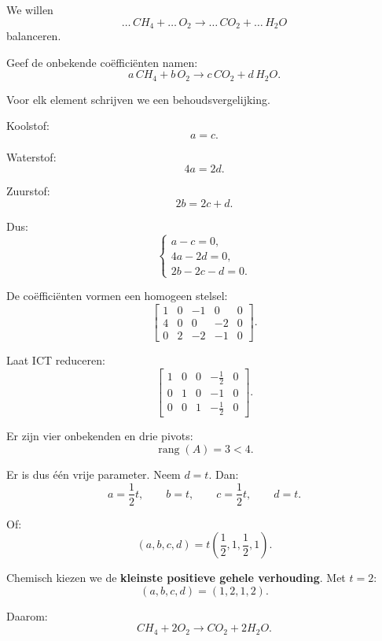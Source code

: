 \documentclass{ximera}
\begin{document}
\begin{voorbeeld}

We willen
\[
\ldots\,CH_4+\ldots\,O_2
\longrightarrow
\ldots\,CO_2+\ldots\,H_2O
\]
balanceren.

Geef de onbekende coëfficiënten namen:
\[
a\,CH_4+b\,O_2
\longrightarrow
c\,CO_2+d\,H_2O.
\]

Voor elk element schrijven we een behoudsvergelijking.

Koolstof:
\[
a=c.
\]

Waterstof:
\[
4a=2d.
\]

Zuurstof:
\[
2b=2c+d.
\]

Dus:
\[
\begin{cases}
a-c=0,\\
4a-2d=0,\\
2b-2c-d=0.
\end{cases}
\]

De coëfficiënten vormen een homogeen stelsel:
\[
\left[
\begin{array}{cccc|c}
1&0&-1&0&0\\
4&0&0&-2&0\\
0&2&-2&-1&0
\end{array}
\right].
\]

Laat ICT reduceren:
\[
\left[
\begin{array}{cccc|c}
1&0&0&-\frac12&0\\
0&1&0&-1&0\\
0&0&1&-\frac12&0
\end{array}
\right].
\]

Er zijn vier onbekenden en drie pivots:
\[
\operatorname{rang}(A)=3<4.
\]

Er is dus één vrije parameter. Neem \(d=t\). Dan:
\[
a=\frac12t,\qquad b=t,\qquad c=\frac12t,\qquad d=t.
\]

Of:
\[
(a,b,c,d)
=
t\left(\frac12,1,\frac12,1\right).
\]

Chemisch kiezen we de \textbf{kleinste positieve gehele verhouding}.
Met \(t=2\):
\[
(a,b,c,d)=(1,2,1,2).
\]

Daarom:
\[
\boxed{CH_4+2O_2\longrightarrow CO_2+2H_2O}.
\]

\end{voorbeeld}



\end{document}
